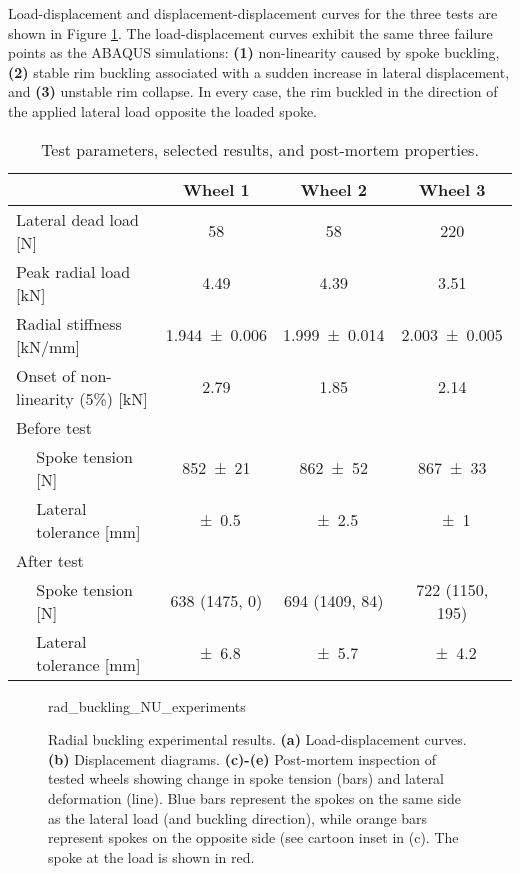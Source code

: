 \documentclass[\rootdir/thesis.tex]{subfiles}
\begin{document}
Load-displacement and displacement-displacement curves for the three tests are shown in Figure \ref{fig:rad_buckling_NU_experiments}. The load-displacement curves exhibit the same three failure points as the ABAQUS simulations: \textbf{(1)} non-linearity caused by spoke buckling, \textbf{(2)} stable rim buckling associated with a sudden increase in lateral displacement, and \textbf{(3)} unstable rim collapse. In every case, the rim buckled in the direction of the applied lateral load opposite the loaded spoke.

\begin{table}
\caption{Test parameters, selected results, and post-mortem properties.}
\label{tab:rad_buckling_tests}
\begin{tabular}{llccc}
\hline
&& \bf Wheel 1 & \bf Wheel 2 & \bf Wheel 3\\
\hline
\multicolumn{2}{l}{Lateral dead load [\si{N}]} & \num{58} & \num{58} & \num{220}\\
\multicolumn{2}{l}{Peak radial load [\si{kN}]} & \num{4.49} & \num{4.39} & \num{3.51}\\
\multicolumn{2}{l}{Radial stiffness [\si{kN/mm}]} & \num{1.944+-0.006} & \num{1.999+-0.014} & \num{2.003+-0.005}\\
\multicolumn{2}{l}{Onset of non-linearity (5\%) [\si{kN}]} & \num{2.79} & \num{1.85} & \num{2.14}\\
\multicolumn{5}{l}{Before test}\\
\,& Spoke tension [\si{N}]      & \num{852+-21} & \num{862+-52} & \num{867+-33}\\
\,& Lateral tolerance [\si{mm}] & \num{+-0.5} & \num{+-2.5} & \num{+-1}\\

\multicolumn{5}{l}{After test}\\
\,& Spoke tension [\si{N}]      & 638 (1475, 0) & 694 (1409, 84) & 722 (1150, 195)\\
\,& Lateral tolerance [\si{mm}] & \num{+-6.8} & \num{+-5.7} & \num{+-4.2}\\
\hline
\end{tabular}
\end{table}

\begin{figure}
\centering
{rad_buckling_NU_experiments}
\caption{Radial buckling experimental results. \textbf{(a)} Load-displacement curves. \textbf{(b)} Displacement diagrams. \textbf{(c)-(e)} Post-mortem inspection of tested wheels showing change in spoke tension (bars) and lateral deformation (line). Blue bars represent the spokes on the same side as the lateral load (and buckling direction), while orange bars represent spokes on the opposite side (see cartoon inset in (c). The spoke at the load is shown in red.}
\label{fig:rad_buckling_NU_experiments}
\end{figure}
\end{document}
